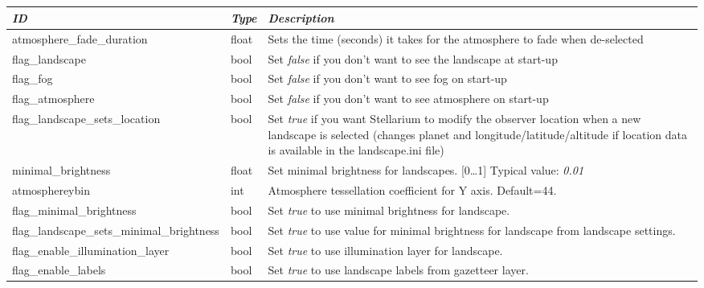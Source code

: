 \subsection{}
\ifhtlatex
\else
\label{sec:configini:landscape}
\fi

\begin{longtable}{l|l|p{68mm}}\toprule
\emph{ID}                            & \emph{Type} & \emph{Description}\\\midrule
atmosphere\_fade\_duration                 & float & Sets the time (seconds) it takes for the atmosphere to fade when de-selected\\%
flag\_landscape                            & bool  & Set \emph{false} if you don't want to see the landscape at start-up\\%
flag\_fog                                  & bool  & Set \emph{false} if you don't want to see fog on start-up\\%
flag\_atmosphere                           & bool  & Set \emph{false} if you don't want to see atmosphere on start-up\\%
flag\_landscape\_sets\_location            & bool  & Set \emph{true} if you want Stellarium to modify the observer location 
                                                     when a new landscape is selected (changes planet and longitude/latitude/altitude 
                                                     if location data is available in the landscape.ini file)\\%
minimal\_brightness                        & float & Set minimal brightness for landscapes. [0\ldots1] Typical value: \emph{0.01}\\%
atmosphereybin		                   & int   & Atmosphere tessellation coefficient for Y axis. Default=44.\\%
flag\_minimal\_brightness                  & bool  & Set \emph{true} to use minimal brightness for landscape.\\%
flag\_landscape\_sets\_minimal\_brightness & bool  & Set \emph{true} to use value for minimal brightness for landscape from landscape settings.\\%
flag\_enable\_illumination\_layer          & bool  & Set \emph{true} to use illumination layer for landscape.\\%
flag\_enable\_labels                       & bool  & Set \emph{true} to use landscape labels from gazetteer layer.\\%

\end{longtable}

